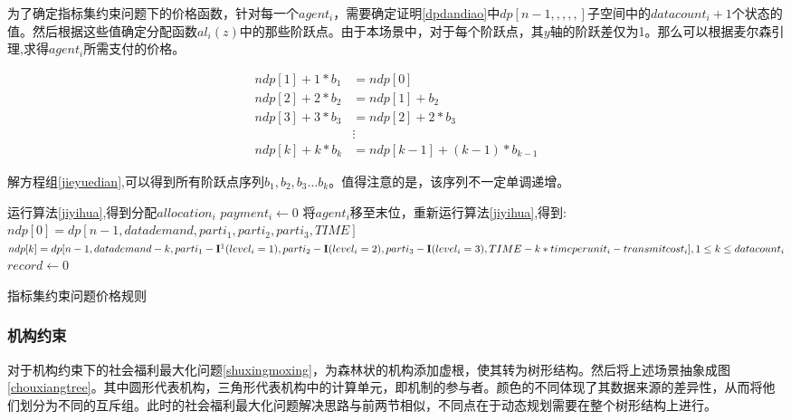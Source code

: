 \documentclass[promaster]{thesis-uestc}
\begin{document}
为了确定指标集约束问题下的价格函数，针对每一个$agent_i$，需要确定证明\ref{dpdandiao}中$dp[n-1,,,,,]$子空间中的$datacount_i+1$个状态的值。然后根据这些值确定分配函数$al_i(z)$中的那些阶跃点。由于本场景中，对于每个阶跃点，其$y$轴的阶跃差仅为1。那么可以根据麦尔森引理,求得$agent_i$所需支付的价格。

\begin{equation}
\label{jieyuedian}
 \begin{aligned}
 ndp[1]+1*b_1&=ndp[0]\\
 ndp[2]+2*b_2&=ndp[1]+b_2\\
 ndp[3]+3*b_3&=ndp[2]+2*b_3\\
 &\vdots\\
 ndp[k]+k*b_k&=ndp[k-1]+(k-1)*b_{k-1}
 \end{aligned}
\end{equation}

解方程组\ref{jieyuedian},可以得到所有阶跃点序列$b_1,b_2,b_3...b_k$。值得注意的是，该序列不一定单调递增。

\setcounter{footnote}{0}

\begin{algorithm}[h]
    运行算法\ref{jiyihua},得到分配$allocation_i$\;
    {
        $payment_i \leftarrow 0$\;
        将$agent_i$移至末位，重新运行算法\ref{jiyihua},得到:\;
        $ndp[0] = dp[n-1,datademand,parti_1,parti_2,parti_3,TIME]$\;
        $ndp[k] = dp[n-1,datademand-k,parti_1-\mathbf{I\footnotemark}(level_i=1),parti_2-\mathbf{I}(level_i=2),parti_3-\mathbf{I}(level_i=3),TIME-k*timeperunit_i-transmitcost_i],1\leq k\leq datacount_i$\;
        $record \leftarrow 0$\;
    }
\caption{指标集约束问题价格规则}
\label{dp_zhifu}
\end{algorithm}


\FloatBarrier

\subsubsection{机构约束}
对于机构约束下的社会福利最大化问题\ref{shuxingmoxing}，为森林状的机构添加虚根，使其转为树形结构。然后将上述场景抽象成图\ref{chouxiangtree}。其中圆形代表机构，三角形代表机构中的计算单元，即机制的参与者。颜色的不同体现了其数据来源的差异性，从而将他们划分为不同的互斥组。此时的社会福利最大化问题解决思路与前两节相似，不同点在于动态规划需要在整个树形结构上进行。
\end{document}
